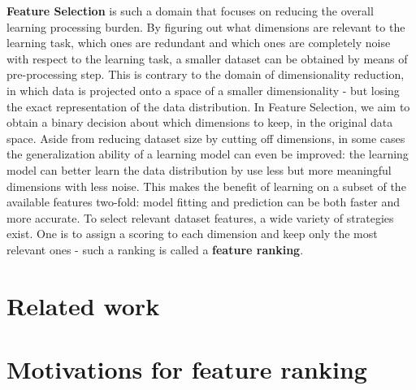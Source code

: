 \documentclass{article}
\begin{document}
\textbf{Feature Selection} is such a domain that focuses on reducing the overall learning processing burden. By figuring out what dimensions are relevant to the learning task, which ones are redundant and which ones are completely noise with respect to the learning task, a smaller dataset can be obtained by means of pre-processing step. This is contrary to the domain of dimensionality reduction, in which data is projected onto a space of a smaller dimensionality - but losing the exact representation of the data distribution. In Feature Selection, we aim to obtain a binary decision about which dimensions to keep, in the original data space. Aside from reducing dataset size by cutting off dimensions, in some cases the generalization ability of a learning model can even be improved: the learning model can better learn the data distribution by use less but more meaningful dimensions with less noise. This makes the benefit of learning on a subset of the available features two-fold: model fitting and prediction can be both faster and more accurate. To select relevant dataset features, a wide variety of strategies exist. One is to assign a scoring to each dimension and keep only the most relevant ones - such a ranking is called a \textbf{feature ranking}.






\section{Related work}



\section{Motivations for feature ranking}
\end{document}
